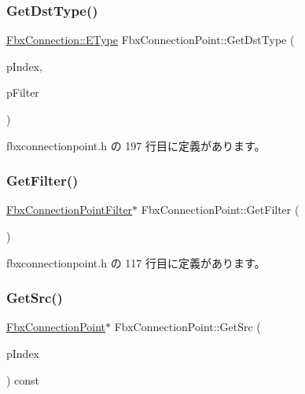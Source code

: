 \subsubsection{\texorpdfstring{Get\+Dst\+Type()}{GetDstType()}\hspace{0.1cm}{\footnotesize\ttfamily [2/2]}}
{\footnotesize\ttfamily \hyperlink{class_fbx_connection_a3df448a5db356652ab99fd2be2553749}{Fbx\+Connection\+::\+E\+Type} Fbx\+Connection\+Point\+::\+Get\+Dst\+Type (\begin{DoxyParamCaption}\item[{int}]{p\+Index,  }\item[{\hyperlink{class_fbx_connection_point_filter}{Fbx\+Connection\+Point\+Filter} $\ast$}]{p\+Filter }\end{DoxyParamCaption})\hspace{0.3cm}{\ttfamily [inline]}}



 fbxconnectionpoint.\+h の 197 行目に定義があります。

\mbox{\label{class_fbx_connection_point_aff0a1b385e12c2f785efd545d595709a}} 
\subsubsection{\texorpdfstring{Get\+Filter()}{GetFilter()}}
{\footnotesize\ttfamily \hyperlink{class_fbx_connection_point_filter}{Fbx\+Connection\+Point\+Filter}$\ast$ Fbx\+Connection\+Point\+::\+Get\+Filter (\begin{DoxyParamCaption}{ }\end{DoxyParamCaption})\hspace{0.3cm}{\ttfamily [inline]}}



 fbxconnectionpoint.\+h の 117 行目に定義があります。

\mbox{\label{class_fbx_connection_point_a87dcd2781e9860479e780c807f7e9b2b}} 
\subsubsection{\texorpdfstring{Get\+Src()}{GetSrc()}\hspace{0.1cm}{\footnotesize\ttfamily [1/2]}}
{\footnotesize\ttfamily \hyperlink{class_fbx_connection_point}{Fbx\+Connection\+Point}$\ast$ Fbx\+Connection\+Point\+::\+Get\+Src (\begin{DoxyParamCaption}\item[{int}]{p\+Index }\end{DoxyParamCaption}) const\hspace{0.3cm}{\ttfamily [inline]}}



